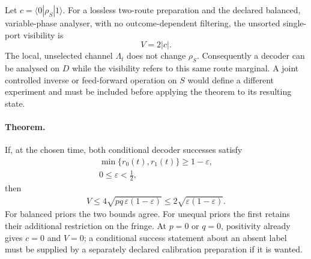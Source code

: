 Let $c=\langle0|\rho_S|1\rangle$. For a lossless two-route preparation
and the declared balanced, variable-phase analyser, with no
outcome-dependent filtering, the unsorted single-port visibility is
\begin{equation}
 V=2|c|.
 \label{eq:chvif-unsorted-record-visibility}
\end{equation}
The local, unselected channel $\Lambda_t$ does not change $\rho_S$.
Consequently a decoder can be analysed on $D$ while the visibility refers
to this same route marginal. A joint controlled inverse or feed-forward
operation on $S$ would define a different experiment and must be included
before applying the theorem to its resulting state.

\paragraph{Theorem.}
If, at the chosen time, both conditional decoder successes satisfy
\begin{equation}
\begin{gathered}
\min\{r_0(t),r_1(t)\}\geq1-\varepsilon,
 \\
 0\leq\varepsilon<\tfrac12,
\end{gathered}
\label{eq:chvif-worst-label-readability}
\end{equation}
then
\begin{equation}
 \boxed{\begin{gathered}
 V\leq4\sqrt{pq\,\varepsilon(1-\varepsilon)}
       \leq2\sqrt{\varepsilon(1-\varepsilon)} .\end{gathered}}
 \label{eq:chvif-readable-visibility-bound}
\end{equation}
For balanced priors the two bounds agree. For unequal priors the first
retains their additional restriction on the fringe. At $p=0$ or $q=0$,
positivity already gives $c=0$ and $V=0$; a conditional success statement
about an absent label must be supplied by a separately declared calibration
preparation if it is wanted.

